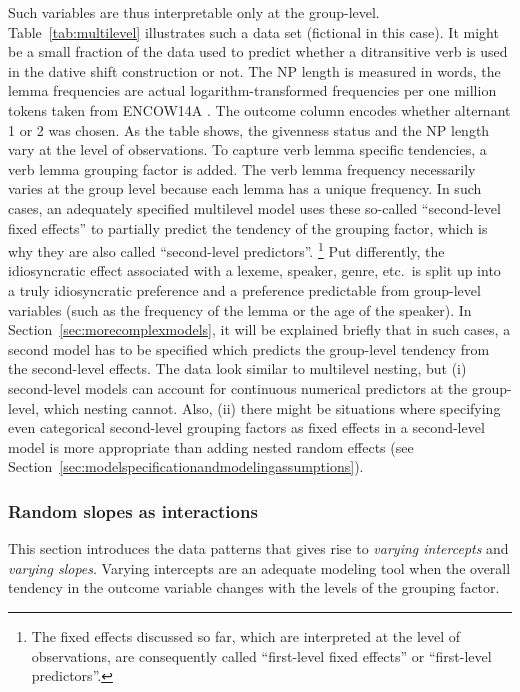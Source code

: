 Such variables are thus interpretable only at the group-level.
Table~\ref{tab:multilevel} illustrates such a data set (fictional in this case).
It might be a small fraction of the data used to predict whether a ditransitive verb is used in the dative shift construction or not.
The NP length is measured in words, the lemma frequencies are actual logarithm-transformed frequencies per one million tokens taken from ENCOW14A \citep{SchaeferBildhauer2012}.
The outcome column encodes whether alternant 1 or 2 was chosen.
As the table shows, the givenness status and the NP length vary at the level of observations.
To capture verb lemma specific tendencies, a verb lemma grouping factor is added.
The verb lemma frequency necessarily varies at the group level because each lemma has a unique frequency.
In such cases, an adequately specified multilevel model uses these so-called ``second-level fixed effects'' to partially predict the tendency of the grouping factor, which is why they are also called ``second-level predictors''.%
\footnote{The fixed effects discussed so far, which are interpreted at the level of observations, are consequently called ``first-level fixed effects'' or ``first-level predictors''.}
Put differently, the idiosyncratic effect associated with a lexeme, speaker, genre, etc.\ is split up into a truly idiosyncratic preference and a preference predictable from group-level variables (such as the frequency of the lemma or the age of the speaker).
In Section~\ref{sec:morecomplexmodels}, it will be explained briefly that in such cases, a second model has to be specified which predicts the group-level tendency from the second-level effects.
The data look similar to multilevel nesting, but (i) second-level models can account for continuous numerical predictors at the group-level, which nesting cannot.
Also, (ii) there might be situations where specifying even categorical second-level grouping factors as fixed effects in a second-level model is more appropriate than adding nested random effects (see Section~\ref{sec:modelspecificationandmodelingassumptions}).


\subsubsection{Random slopes as interactions}
\label{sec:randominterceptsandslopes}

This section introduces the data patterns that gives rise to \textit{varying intercepts} and \textit{varying slopes}. 
Varying intercepts are an adequate modeling tool when the overall tendency in the outcome variable changes with the levels of the grouping factor.

